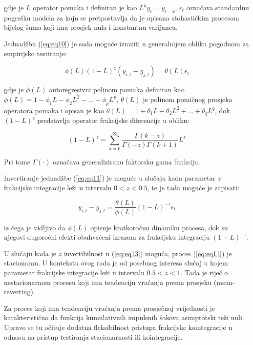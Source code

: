 \documentclass{crebsshr}
\begin{document}
    gdje je \( L \) operator pomaka i definiran je kao \( L^k y_t = y_{t-k} \), \( \epsilon_t \) označava standardnu pogrešku modela za koju se pretpostavlja da je opisana stohastičkim procesom bijelog šuma koji ima prosjek nula i konstantnu varijancu.
    
    Jednadžbu (\ref{eq:eq10}) je sada moguće izraziti u generalnijem obliku pogodnom za empirijsko testiranje:
    
    \begin{equation} \label{eq:eq11}
    \phi(L)(1-L)^z (y_{i,t} - y_{j,t}) = \theta(L)\epsilon_t
    \end{equation}
    
    gdje je \( \phi(L) \) autoregresivni polinom pomaka definiran kao \( \phi(L) = 1 - \phi_1 L - \phi_2 L^2 - \dots - \phi_p L^p \), \( \theta(L) \) je polinom pomičnog prosjeka operatora pomaka i opisan je kao \( \theta(L) = 1 + \theta_1 L + \theta_2 L^2 + \dots + \theta_q L^q \), dok \( (1-L)^z \) predstavlja operator frakcijske diferencije u obliku:
    
    \begin{equation} \label{eq:eq12}
    (1-L)^z = \sum_{k=0}^{\infty} \frac{\Gamma(k-z)}{\Gamma(-z)\Gamma(k+1)} L^k
    \end{equation}
    
    Pri tome \( \Gamma(\cdot) \) označava generaliziranu faktorsku gama funkciju.
    
    Invertiranje jednadžbe (\ref{eq:eq11}) je moguće u slučaju kada parametar \( z \) frakcijske integracije leži u intervalu \( 0<z<0.5 \), te je tada moguće je zapisati:
    
    \begin{equation} \label{eq:eq13}
    y_{i,t} - y_{j,t} = \frac{\theta(L)}{\phi(L)}(1-L)^{-z}\epsilon_t
    \end{equation}
    
    iz čega je vidljivo da \( \phi(L) \) opisuje kratkoročnu dinamiku procesa, dok su njegovi dugoročni efekti obuhvaćeni izrazom za frakcijsku integraciju \( (1-L)^{-z} \).
    
    U slučaju kada je \( z \) invertibilnost u (\ref{eq:eq13}) moguća, proces (\ref{eq:eq11}) je stacionaran. U kontekstu ovog rada je od posebnog interesa slučaj u kojem parametar frakcijske integracije leži u intervalu \( 0.5<z<1 \). Tada je riječ o nestacionarnom procesu koji ima tendenciju vraćanja prema prosjeku (mean-reverting).
    
    Za proces koji ima tendenciju vraćanja prema prosječnoj vrijednosti je karakteristično da funkcija kumulativnih impulsnih šokova asimptotski teži nuli. Upravo se tu očituje dodatna fleksibilnost pristupa frakcijske kointegracije u odnosu na pristup testiranja stacionarnosti ili kointegracije.
    
\end{document}
